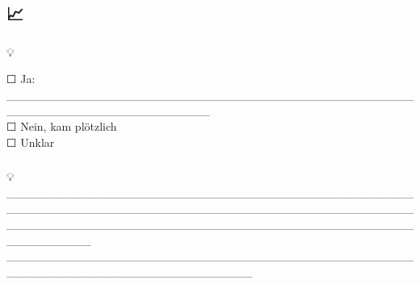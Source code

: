 \hfill\break
\hfill\break

\hfill\break
\hfill\break

\hfill\break
\hfill\break

\hypertarget{lernpunkte}{%
\subsection[📈 \ul{\textbf{\textcolor{ctmmBlue}{\1}}}]{\texorpdfstring{\protect\hypertarget{lernpunkte}{}{}📈 \ul{\textbf{\textcolor{ctmmBlue}{\1}}}}{📈 LERNPUNKTE}}\label{lernpunkte}}

\hypertarget{fruxfchwarnsignale-erkannt}{%
\subsubsection[\textbf{\textcolor{ctmmBlue}{\1}}]{\texorpdfstring{\protect\hypertarget{fruxfchwarnsignale-erkannt}{}{}\textbf{\textcolor{ctmmBlue}{\1}}}{Frühwarnsignale erkannt:}}\label{fruxfchwarnsignale-erkannt}}

💡 \textcolor{ctmmGreen}{\textit{\1}}

☐ Ja: \_\_\_\_\_\_\_\_\_\_\_\_\_\_\_\_\_\_\_\_\_\_\_\_\_\_\_\_\_\_\_\_\_\_\_\_\_\_\_\_\_\_\_\_\_\_\_\_\_\_\_\_\_\_\_\_\_\_\_\_\_\_\_\_\_\_\_\_\_\_\_\_\\
☐ Nein, kam plötzlich\\
☐ Unklar

\hfill\break
\hfill\break

\hypertarget{nuxe4chstes-mal-anders-machen}{%
\subsubsection[\textbf{\textcolor{ctmmBlue}{\1}}]{\texorpdfstring{\protect\hypertarget{nuxe4chstes-mal-anders-machen}{}{}\textbf{\textcolor{ctmmBlue}{\1}}}{Nächstes Mal anders machen:}}\label{nuxe4chstes-mal-anders-machen}}

💡 \textcolor{ctmmGreen}{\textit{\1}} \_\_\_\_\_\_\_\_\_\_\_\_\_\_\_\_\_\_\_\_\_\_\_\_\_\_\_\_\_\_\_\_\_\_\_\_\_\_\_\_\_\_\_\_\_\_\_\_\_\_\_\_\_\_\_\_\_\_\_\_\_\_\_\_\_\_\_\_\_\_\_\_\_\_\_\_\_\_\_\_\_\_\_\_\_\_\_\_\_\_\_\_\_\_\_\_\_\_\_\_\_\_\_\_\_\_\_\_\_\_\_\_\_\_\_\_\_\_\_\_\_\_\_\_\_\_\_\_\_\_\_\_\_\_\_\_\_\_\_\_\_\_\_\_\_\_\_\_\_\_\_\_\_\_\\
\_\_\_\_\_\_\_\_\_\_\_\_\_\_\_\_\_\_\_\_\_\_\_\_\_\_\_\_\_\_\_\_\_\_\_\_\_\_\_\_\_\_\_\_\_\_\_\_\_\_\_\_\_\_\_\_\_\_\_\_\_\_\_\_\_\_\_\_\_\_\_\_\_\_\_\_\_

\hfill\break
\hfill\break

